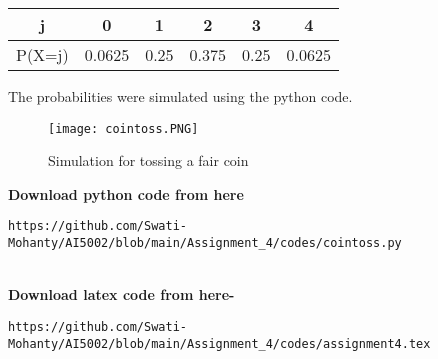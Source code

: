 \documentclass[journal,12pt,twocolumn]{IEEEtran}
\begin{document}
\begin{center}
\begin{tabular}{ |c|c|c|c|c|c| } 
 \hline
 j & 0 & 1 & 2 & 3 & 4 \\ \hline
 P(X=j) & 0.0625 & 0.25 & 0.375 & 0.25 & 0.0625 \\ 
 \hline
\end{tabular}
\end{center}
The probabilities were simulated using the python code.
\begin{figure}[h]
\renewcommand{\theenumi}{1}
\centering
\texttt{[image: cointoss.PNG]}
\caption{Simulation for tossing a fair coin  }
\label{Fig:1}
\end{figure}

\textbf{Download python code from here}\\
\begin{lstlisting}
https://github.com/Swati-Mohanty/AI5002/blob/main/Assignment_4/codes/cointoss.py
\end{lstlisting}
\\\textbf{Download latex code from here-}\\
\begin{lstlisting}
https://github.com/Swati-Mohanty/AI5002/blob/main/Assignment_4/codes/assignment4.tex
\end{lstlisting}
\end{document}
